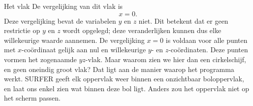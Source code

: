 \begin{surferPage}[Vlak]{Het vlak}
De vergelijking van dit vlak is \[x=0.\] Deze vergelijking bevat de variabelen $y$ en $z$ niet. Dit betekent dat er geen restrictie op $y$ en $z$ wordt opgelegd; deze veranderlijken kunnen dus elke willekeurige waarde aannemen.
De vergelijking $x=0$ is voldaan voor alle punten met $x$-co\"ordinaat gelijk aan nul en willekeurige $y$- en $z$-co\"ordinaten. Deze punten vormen het zogenaamde $yz$-vlak.
\newline \newline
Maar waarom zien we hier dan een cirkelschijf, en geen oneindig groot vlak? Dat ligt aan de manier waarop het programma werkt. SURFER geeft elk oppervlak weer binnen een onzichtbaar boloppervlak, en laat ons enkel zien wat binnen deze bol ligt. Anders zou het oppervlak niet op het scherm passen.
\end{surferPage}
